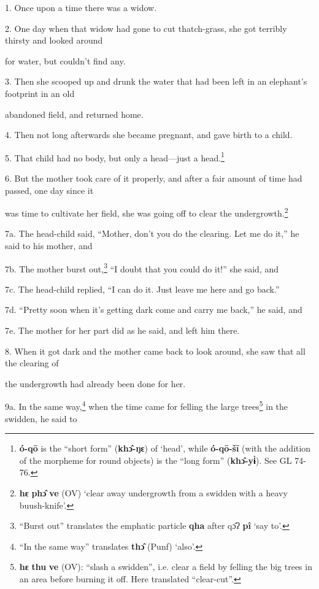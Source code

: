 \setcounter{footnote}{0}

1. Once upon a time there was a widow.

2. One day when that widow had gone to cut thatch-grass, she got terribly thirsty
and looked around

for water, but couldn't find any.

3. Then she scooped up and drunk the water that had been left in an elephant's
footprint in an old

abandoned field, and returned home.

4. Then not long afterwards she became pregnant, and gave birth to a child.

5. That child had no body, but only a head---just a head.\footnote{\textbf{ó-qō} is the ``short form'' (\textbf{khɔ̂-ŋɛ}) of `head', while \textbf{ó-qō-šī} (with the addition of the morpheme for round objects) is the ``long form'' (\textbf{khɔ̂-yɨ̀}). See GL 74-76.}

6. But the mother took care of it properly, and after a fair amount of time had
passed, one day since it

was time to cultivate her field, she was going off to clear the undergrowth.\footnote{\textbf{hɛ} \textbf{phɔ̂} \textbf{ve} (OV) `clear away undergrowth from a swidden with a heavy buush-knife'.}

7a. The head-child said, ``Mother, don't you do the clearing. Let me do it,'' he
said to his mother, and

7b. The mother burst out,\footnote{``Burst out'' translates the emphatic particle \textbf{qha} after qɔ̂ʔ \textbf{pî} `say to'.} ``I doubt that you could do it!'' she said, and

7c. The head-child replied, ``I can do it. Just leave me here and go back.''

7d. ``Pretty soon when it's getting dark come and carry me back,'' he said, and

7e. The mother for her part did as he said, and left him there.

8. When it got dark and the mother came back to look around, she saw that all the
clearing of

the undergrowth had already been done for her.

9a. In the same way,\footnote{``In the same way'' translates \textbf{thɔ̂} (Punf) `also'.} when the time came for felling the large trees\footnote{\textbf{hɛ} \textbf{thu} \textbf{ve} (OV): ``slash a swidden'', i.e. clear a field by felling the big trees in an area before burning it off. Here translated ``clear-cut''.} in
the swidden, he said to

